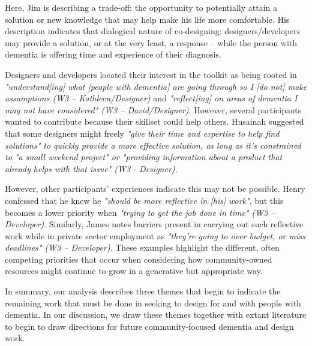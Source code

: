 Here, Jim is describing a trade-off: the opportunity to potentially attain a solution or new knowledge that may help make his life more comfortable. His description indicates that dialogical nature of co-designing: designers/developers may provide a solution, or at the very least, a response – while the person with dementia is offering time and experience of their diagnosis. 

Designers and developers located their interest in the toolkit as being rooted in \textit{"understand[ing] what [people with dementia] are going through so I [do not] make assumptions (W3 – Kathleen/Designer)} and \textit{"reflect[ing] on areas of dementia I may not have considered" (W3 – David/Designer)}. However, several participants wanted to contribute because their skillset could help others. Husainah suggested that some designers might freely \textit{"give their time and expertise to help find solutions" to quickly provide a more effective solution, as long as it’s constrained to "a small weekend project" or "providing information about a product that already helps with that issue" (W3 - Designer).}

However, other participants’ experiences indicate this may not be possible. Henry confessed that he knew he \textit{"should be more reflective in [his] work"}, but this becomes a lower priority when \textit{"trying to get the job done in time" (W3 – Developer)}. Similarly, James notes barriers present in carrying out such reflective work while in private sector employment as \textit{"they're going to over budget, or miss deadlines" (W3 – Developer)}. These examples highlight the different, often competing priorities that occur when considering how community-owned resources might continue to grow in a generative but appropriate way.

In summary, our analysis describes three themes that begin to indicate the remaining work that must be done in seeking to design for and with people with dementia. In our discussion, we draw these themes together with extant literature to begin to draw directions for future community-focused dementia and design work.
